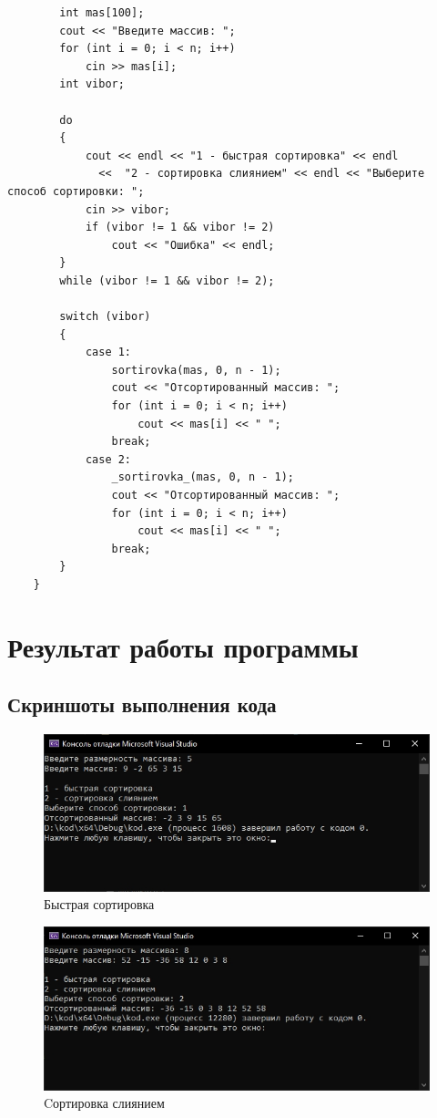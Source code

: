 \documentclass[12pt,a4paper]{scrartcl}
\begin{document}
\begin{verbatim}
	    int mas[100];
	    cout << "Введите массив: ";
	    for (int i = 0; i < n; i++)
	        cin >> mas[i];
	    int vibor;
	
	    do
	    {
	        cout << endl << "1 - быстрая сортировка" << endl
			  <<  "2 - сортировка слиянием" << endl << "Выберите способ сортировки: ";
	        cin >> vibor;
	        if (vibor != 1 && vibor != 2)
	            cout << "Ошибка" << endl;
	    }
	    while (vibor != 1 && vibor != 2);
	    
	    switch (vibor)
	    {
	        case 1:
	            sortirovka(mas, 0, n - 1);
	            cout << "Отсортированный массив: ";
	            for (int i = 0; i < n; i++)
	                cout << mas[i] << " ";
	            break;
	        case 2:
	            _sortirovka_(mas, 0, n - 1);
	            cout << "Отсортированный массив: ";
	            for (int i = 0; i < n; i++)
	                cout << mas[i] << " ";
	            break;
	    }
	}	
	\end{verbatim}
	
	\section{Результат работы программы}
	\label{sec:result}
	
	\subsection{Скриншоты выполнения кода}
	\label{sec:result:screen}
	\begin{figure}[h]
	\centering
	\includegraphics[width=1\textwidth]{res1.jpg}
	\caption{Быстрая сортировка}\label{figure1:screen}
	\end{figure}

	\begin{figure}[h]
	\centering
	\includegraphics[width=1\textwidth]{res2.jpg}
	\caption{Cортировка слиянием}\label{figure2:screen}
	\end{figure}
\end{document}
